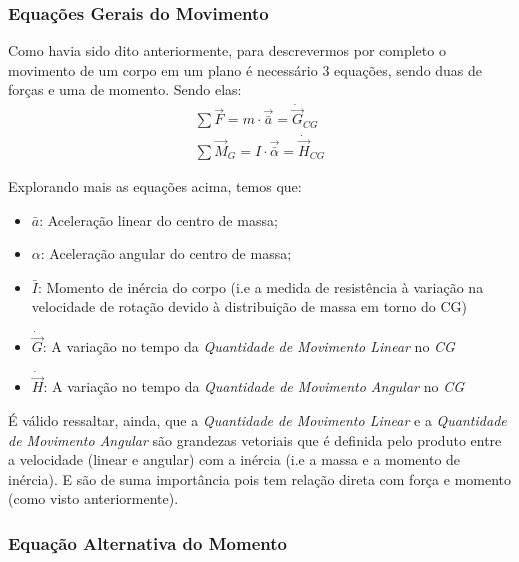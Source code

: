 \documentclass{article}
\begin{document}
            \subsubsection[Eq. Gerais do Mov.]{Equações Gerais do Movimento}

                Como havia sido dito anteriormente, para descrevermos por completo o movimento de um corpo em um plano é necessário 3 equações, sendo duas de forças e uma de momento. Sendo elas:
                \begin{align}
                    \sum \vec F = m \cdot \vec{\bar a} = \dot{\vec{G}}_{CG} \label{eq:SomaDasForcasCg} \\
                    \sum \vec M_G =  I \cdot \vec{\bar\alpha} = \dot{\vec{H}}_{CG} \label{eq:soma_dos_momentos_cg}
                \end{align}

                Explorando mais as equações acima, temos que:
                \begin{itemize}
                    \item $\bar a$: Aceleração linear do centro de massa;
                    \item $\alpha$: Aceleração angular do centro de massa;
                    \item $\bar I$: Momento de inércia do corpo (i.e a medida de resistência à variação na velocidade de rotação devido à distribuição de massa em torno do CG)
                    \item $\dot{\vec{G}}$: A variação no tempo da \emph{Quantidade de Movimento Linear} no \emph{CG}
                    \item $\dot{\vec{H}}$: A variação no tempo da \emph{Quantidade de Movimento Angular} no \emph{CG}
                \end{itemize}

                É válido ressaltar, ainda, que a \emph{Quantidade de Movimento Linear} e a \emph{Quantidade de Movimento Angular} são grandezas vetoriais que é definida pelo produto entre a velocidade (linear e angular)
                com a inércia (i.e a massa e a momento de inércia). E são de suma importância pois tem relação direta com força e momento (como visto anteriormente).


            \subsubsection[Eq. Alternativa do Momento]{Equação Alternativa do Momento}
\end{document}
